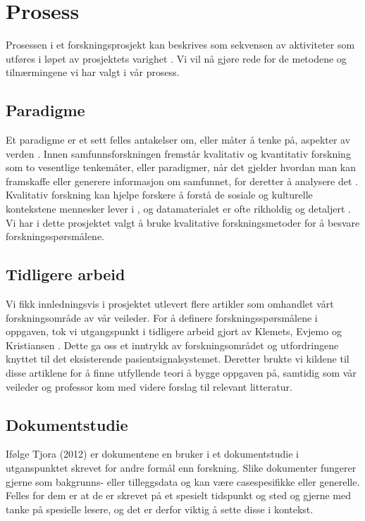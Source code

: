 \section{Prosess}
\label{chp: prosess}

Prosessen i et forskningsprosjekt kan beskrives som sekvensen av aktiviteter som utføres i løpet av prosjektets varighet \cite{Oates}. Vi vil nå gjøre rede for de metodene og tilnærmingene vi har valgt i vår prosess.

\subsection{Paradigme}
Et paradigme er et sett felles antakelser om, eller måter å tenke på, aspekter av verden \cite{Oates}. Innen samfunnsforskningen fremstår kvalitativ og kvantitativ forskning som to vesentlige tenkemåter, eller paradigmer, når det gjelder hvordan man kan framskaffe eller generere informasjon om samfunnet, for deretter å analysere det \cite{Tjora}. Kvalitativ forskning kan hjelpe forskere å forstå de sosiale og kulturelle kontekstene mennesker lever i \cite{Myers97}, og datamaterialet er ofte rikholdig og detaljert \cite{Oates}. Vi har i dette prosjektet valgt å bruke kvalitative forskningsmetoder for å besvare forskningsspørsmålene.

\subsection{Tidligere arbeid}
Vi fikk innledningsvis i prosjektet utlevert flere artikler som omhandlet vårt forskningsområde av vår veileder. For å definere forskningsspørsmålene i oppgaven, tok vi utgangspunkt i tidligere arbeid gjort av Klemets, Evjemo og Kristiansen \cite{klemets13, Klemets12, KlemetsRedundancy}. Dette ga oss et inntrykk av forskningsområdet og utfordringene knyttet til det eksisterende pasientsignalsystemet. Deretter brukte vi kildene til disse artiklene for å finne utfyllende teori å bygge oppgaven på, samtidig som vår veileder og professor kom med videre forslag til relevant litteratur.  

\subsection{Dokumentstudie}
Ifølge Tjora (2012) er dokumentene en bruker i et dokumentstudie i utganspunktet skrevet for andre formål enn forskning. Slike dokumenter fungerer gjerne som bakgrunns- eller tilleggsdata og kan være casespesifikke eller generelle. Felles for dem er at de er skrevet på et spesielt tidspunkt og sted og gjerne med tanke på spesielle lesere, og det er derfor viktig å sette disse i kontekst.

